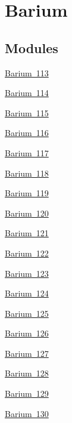 \hypertarget{group___isotope_const-_barium}{}\section{Barium}
\label{group___isotope_const-_barium}
\subsection*{Modules}
\begin{DoxyCompactItemize}
\item 
\mbox{\hyperlink{group___isotope_const-_barium-_ba113}{Barium 113}}
\item 
\mbox{\hyperlink{group___isotope_const-_barium-_ba114}{Barium 114}}
\item 
\mbox{\hyperlink{group___isotope_const-_barium-_ba115}{Barium 115}}
\item 
\mbox{\hyperlink{group___isotope_const-_barium-_ba116}{Barium 116}}
\item 
\mbox{\hyperlink{group___isotope_const-_barium-_ba117}{Barium 117}}
\item 
\mbox{\hyperlink{group___isotope_const-_barium-_ba118}{Barium 118}}
\item 
\mbox{\hyperlink{group___isotope_const-_barium-_ba119}{Barium 119}}
\item 
\mbox{\hyperlink{group___isotope_const-_barium-_ba120}{Barium 120}}
\item 
\mbox{\hyperlink{group___isotope_const-_barium-_ba121}{Barium 121}}
\item 
\mbox{\hyperlink{group___isotope_const-_barium-_ba122}{Barium 122}}
\item 
\mbox{\hyperlink{group___isotope_const-_barium-_ba123}{Barium 123}}
\item 
\mbox{\hyperlink{group___isotope_const-_barium-_ba124}{Barium 124}}
\item 
\mbox{\hyperlink{group___isotope_const-_barium-_ba125}{Barium 125}}
\item 
\mbox{\hyperlink{group___isotope_const-_barium-_ba126}{Barium 126}}
\item 
\mbox{\hyperlink{group___isotope_const-_barium-_ba127}{Barium 127}}
\item 
\mbox{\hyperlink{group___isotope_const-_barium-_ba128}{Barium 128}}
\item 
\mbox{\hyperlink{group___isotope_const-_barium-_ba129}{Barium 129}}
\item 
\mbox{\hyperlink{group___isotope_const-_barium-_ba130}{Barium 130}}

\end{DoxyCompactItemize}
